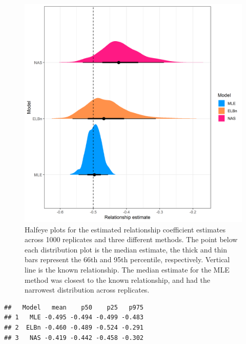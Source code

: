 \documentclass[
]{article}
\begin{document}
\begin{figure}
\centering
\includegraphics{figures/PLB_sim_relationship_density.png}
\caption{Halfeye plots for the estimated relationship coefficient
estimates across 1000 replicates and three different methods. The point
below each distribution plot is the median estimate, the thick and thin
bars represent the 66th and 95th percentile, respectively. Vertical line
is the known relationship. The median estimate for the MLE method was
closest to the known relationship, and had the narrowest distribution
across replicates.}
\end{figure}

\newpage

\begin{verbatim}
##   Model   mean    p50    p25   p975
## 1   MLE -0.495 -0.494 -0.499 -0.483
## 2  ELBn -0.460 -0.489 -0.524 -0.291
## 3   NAS -0.419 -0.442 -0.458 -0.302
\end{verbatim}
\end{document}
